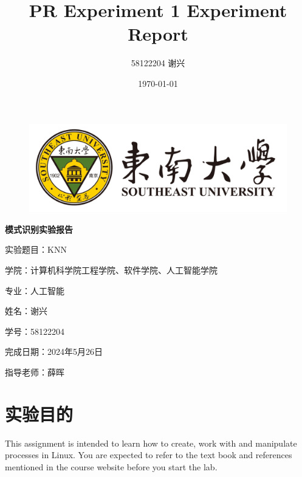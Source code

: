 \documentclass[12pt]{article}
\title{\textbf{PR Experiment 1 Experiment Report}}
\author{58122204 谢兴}
\date{\today}
\begin{document}
\begin{titlepage}

  \begin{figure}[htbp]
    \centering
    \includegraphics[scale=0.2]{figures/southeast_university_logo.png}
    \label{fig1}
  \end{figure}


  \centering
  \vspace*{40pt}
  \Huge\textbf{模式识别实验报告}

  \vspace{60pt}
  \Large
  实验题目：KNN

  \vspace{25pt}
  学院：计算机科学院工程学院、软件学院、人工智能学院

  \vspace{25pt}
  专业：人工智能

  \vspace{25pt}
  姓名：谢兴

  \vspace{25pt}
  学号：58122204

  \vspace{25pt}
  完成日期：2024年5月26日

  \vspace{25pt}
  指导老师：薛晖





\end{titlepage}


\newpage
\tableofcontents


\section*{实验目的}
This assignment is intended to learn how to create, work with and manipulate processes in Linux.
You are expected to refer to the text book and references mentioned in the course website before you start the lab.
\end{document}
